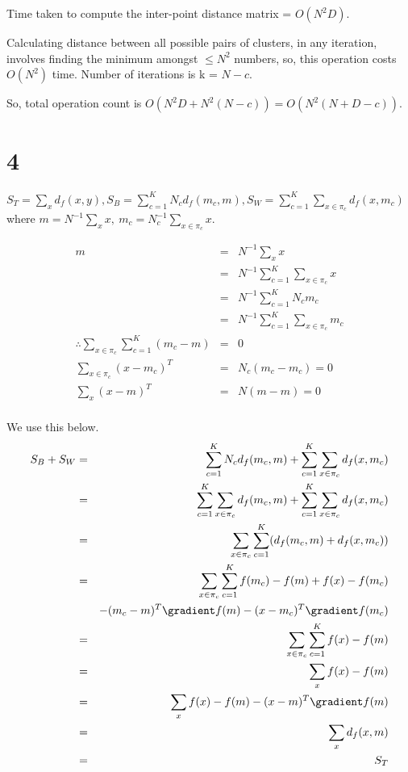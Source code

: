 \documentclass{article}
\begin{document}
Time taken to compute the inter-point distance matrix = $O(N^{2}D)$. 

Calculating distance between all possible pairs of clusters, in any iteration, involves finding the minimum amongst $\leq N^{2}$ numbers, so, this operation costs $O(N^{2})$ time. Number of iterations is k = $N-c$.

So, total operation count is $O(N^{2}D + N^{2}(N-c)) = O(N^{2}(N+D-c))$.


\section{4}
$S_T = \sum_x d_f(x,y), S_B = \sum_{c=1}^{K} N_c d_f(m_c,m), S_W = \sum_{c=1}^{K} \sum_{x \in \pi_c} d_f(x,m_c)$\\
 where $m = N^{-1}\sum_x x,\ m_c = N_c^{-1}\sum_{x \in \pi_c} x$.

\begin{eqnarray*}
m &=& N^{-1}\sum_x x\\
&=& N^{-1}\sum_{c=1}^{K} \sum_{x \in \pi_c}  x\\
&=& N^{-1}\sum_{c=1}^{K} N_c m_c\\
&=& N^{-1}\sum_{c=1}^{K} \sum_{x \in \pi_c} m_c\\
\therefore \sum_{x \in \pi_c} \sum_{c=1}^{K} (m_c - m) & = & 0\\
\sum_{x \in \pi_c} (x - m_c)^{T} &=& N_c(m_c - m_c) = 0\\
\sum_{x } (x - m)^{T} &=& N(m - m) = 0\\
\end{eqnarray*}

We use this below.
\begin{eqnarray*}
S_B + S_W &=& \sum_{c=1}^{K} N_c d_f(m_c,m) + \sum_{c=1}^{K} \sum_{x \in \pi_c} d_f(x,m_c)\\ 
&=& \sum_{c=1}^{K} \sum_{x \in \pi_c} d_f(m_c,m) + \sum_{c=1}^{K} \sum_{x \in \pi_c} d_f(x,m_c)\\
&=& \sum_{x \in \pi_c} \sum_{c=1}^{K} (d_f(m_c,m) + d_f(x,m_c))\\
&=& \sum_{x \in \pi_c} \sum_{c=1}^{K} f(m_c) - f(m) + f(x) - f(m_c) \\
&& - (m_c - m)^{T}\gradient f(m) - (x - m_c)^{T}\gradient f(m_c)\\
&=& \sum_{x \in \pi_c} \sum_{c=1}^{K} f(x) - f(m)\\
&=& \sum_{x} f(x) - f(m)\\
&=& \sum_{x} f(x) - f(m) - (x - m)^{T} \gradient f(m)\\
&=& \sum_{x} d_f(x, m)\\
&=& S_T\\
\end{eqnarray*}


% 
% 
\end{document}
